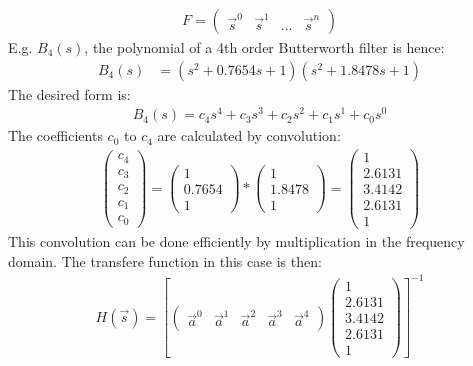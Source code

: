 \documentclass[pdftex,a4paper,parskip,listof=totoc,bibliography=totoc,onehalfspacing,12pt]{scrreprt}
\begin{document}
\begin{align*}
 F = \begin{pmatrix}
      \vec{s}^0 & \vec{s}^1 & \dots & \vec{s}^n
     \end{pmatrix}
\end{align*}
E.g. $B_4(s)$, the polynomial of a 4th order Butterworth filter is hence:
\begin{align*}
  B_4(s) &= (s^2+0.7654s+1)(s^2+1.8478s+1)
\end{align*}
The desired form is:
\begin{align*}
 B_4(s) = c_4 s^4 + c_3 s^3 + c_2 s^2 +c_1 s^1 +c_0 s^0
\end{align*}
The coefficients $c_0$ to $c_4$ are calculated by convolution:
\begin{align*}
\begin{pmatrix} c_4 \\ c_3 \\ c_2 \\ c_1 \\ c_0 \end{pmatrix}  = \begin{pmatrix}1 \\ 0.7654 \\ 1 \end{pmatrix} * \begin{pmatrix}1 \\ 1.8478 \\ 1\end{pmatrix} = \begin{pmatrix} 1 \\ 2.6131 \\ 3.4142 \\ 2.6131 \\ 1 \end{pmatrix}
\end{align*}
This convolution can be done efficiently by multiplication in the frequency domain. The transfere function in this case is then:
\begin{align*}
 H(\vec{s}) = \left[ \begin{pmatrix} \vec{a}^0 & \vec{a}^1 &  \vec{a}^2 &  \vec{a}^3 & \vec{a}^4 \end{pmatrix} \begin{pmatrix} 1 \\ 2.6131 \\ 3.4142 \\ 2.6131 \\ 1 \end{pmatrix} \right]^{-1}
\end{align*}
\end{document}
